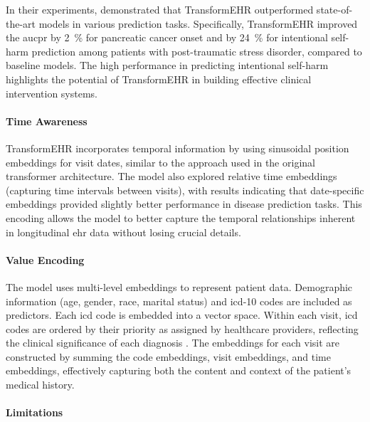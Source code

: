 In their experiments, \citeauthor{TransformEHR2023} demonstrated that TransformEHR outperformed state-of-the-art models in various prediction tasks. Specifically, TransformEHR improved the \gls{aucpr} by \qty{2}{\percent} for pancreatic cancer onset and by \qty{24}{\percent} for intentional self-harm prediction among patients with post-traumatic stress disorder, compared to baseline models. The high performance in predicting intentional self-harm highlights the potential of TransformEHR in building effective clinical intervention systems.

\paragraph{Time Awareness}

TransformEHR incorporates temporal information by using sinusoidal position embeddings for visit dates, similar to the approach used in the original transformer architecture. The model also explored relative time embeddings (capturing time intervals between visits), with results indicating that date-specific embeddings provided slightly better performance in disease prediction tasks. This encoding allows the model to better capture the temporal relationships inherent in longitudinal \gls{ehr} data without losing crucial details.

\paragraph{Value Encoding}

The model uses multi-level embeddings to represent patient data. Demographic information (age, gender, race, marital status) and \gls{icd}-10 codes are included as predictors. Each \gls{icd} code is embedded into a vector space. Within each visit, \gls{icd} codes are ordered by their priority as assigned by healthcare providers, reflecting the clinical significance of each diagnosis \cite[][3]{TransformEHR2023}. The embeddings for each visit are constructed by summing the code embeddings, visit embeddings, and time embeddings, effectively capturing both the content and context of the patient's medical history.

\paragraph{Limitations}

